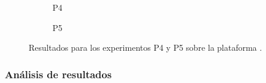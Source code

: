 \begin{figure}
  \centering
    \begin{subfigure}{0.75\textwidth}
      \centering
      \caption{P4}
    \end{subfigure}

    \vspace{0.5cm}

    \begin{subfigure}{0.75\textwidth}
      \centering
      \caption{P5}
    \end{subfigure}  
  \caption{Resultados para los experimentos P4 y P5 sobre la plataforma
    \juno.}
  \label{fig:detalle:p1-p4}
\end{figure}



\subsubsection{Análisis de resultados}




